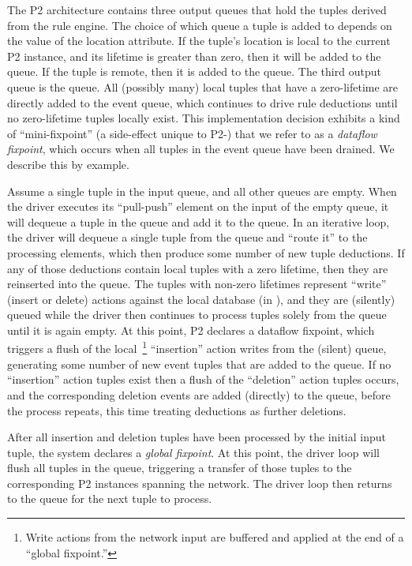 The P2 architecture contains three output queues that hold the tuples derived
from the rule engine.  The choice of which queue a tuple is added to depends on
the value of the location attribute.  If the tuple's location is local to the
current P2 instance, and its lifetime is greater than zero, then it will be
added to the  queue.  If the tuple is remote, then it is added to
the  queue.  The third output queue is the  queue.  All
(possibly many) local tuples that have a zero-lifetime are directly added to
the event queue, which continues to drive rule deductions until no zero-lifetime
tuples locally exist.  This implementation decision exhibits a kind of
``mini-fixpoint'' (a side-effect unique to P2-\OVERLOG) that we refer to as a
{\em dataflow fixpoint}, which occurs when all tuples in the event queue have
been drained.  We describe this by example.

Assume a single tuple in the  input queue, and all other queues
are empty.  When the driver executes its ``pull-push'' element on the input of
the empty  queue, it will dequeue a tuple in the  queue
and add it to the  queue.  In an iterative loop, the driver will
dequeue a single tuple from the  queue and ``route it'' to the
processing elements, which then produce some number of new tuple deductions.
If any of those deductions contain local tuples with a zero lifetime, then they
are reinserted into the  queue.  The tuples with non-zero lifetimes
represent ``write'' (insert or delete) actions against the local database (in
), and they are (silently) queued while the driver then continues
to process tuples solely from the  queue until it is again empty.  At
this point, P2 declares a dataflow fixpoint, which triggers a flush of the
local~\footnote{Write actions from the network input are buffered and applied
at the end of a ``global fixpoint.''} ``insertion'' action writes from the
(silent) queue, generating some number of new event tuples that are added to the
 queue.  If no ``insertion'' action tuples exist then a flush of
the ``deletion'' action tuples occurs, and the corresponding deletion events
are added (directly) to the  queue, before the process repeats, this
time treating deductions as further deletions.

After all insertion and deletion tuples have been processed by the initial
 input tuple, the system declares a {\em global fixpoint}.  At
this point, the driver loop will flush all tuples in the  queue,
triggering a transfer of those tuples to the corresponding P2 instances
spanning the network.  The driver loop then returns to the  queue
for the next tuple to process.

